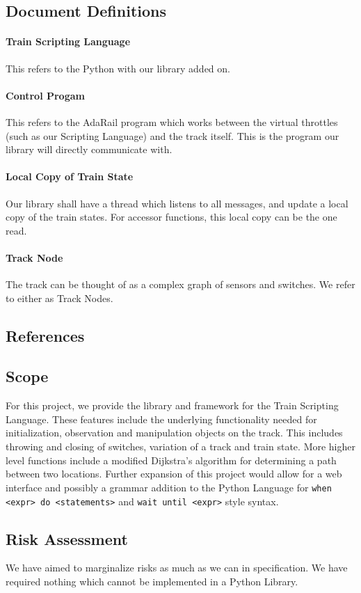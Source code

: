 \documentclass[a4paper,11pt,notitlepage]{article}
\def\TSL{Train Scripting Language\xspace}
\def\CS{Control Progam\xspace}
\def\LC{Local Copy of Train State\xspace}
\def\TN{Track Node\xspace}
\begin{document}
\subsection{Document Definitions}
\paragraph{\TSL} This refers to the Python with our library added on.
\paragraph{\CS} This refers to the AdaRail program which works between the virtual throttles (such as our Scripting Language) and the track itself. This is the program our library will directly communicate with.
\paragraph{\LC} Our library shall have a thread which listens to all messages, and update a local copy of the train states. For accessor functions, this local copy can be the one read.
\paragraph{\TN} The track can be thought of as a complex graph of sensors and switches. We refer to either as \TN{}s.
\subsection{References}

\newpage
\subsection{Scope}
For this project, we provide the library and framework for the \TSL. These features include the underlying functionality needed for initialization, observation and manipulation objects on the track.  This includes throwing and closing of switches, variation of a track and train state.  More higher level functions include a modified Dijkstra's algorithm for determining a path between two locations.  Further expansion of this project would allow for a web interface and possibly a grammar addition to the Python Language for \verb=when <expr> do <statements>= and \verb=wait until <expr>= style syntax.

\subsection{Risk Assessment}
We have aimed to marginalize risks as much as we can in specification. We have required nothing which cannot be implemented in a Python Library.
\end{document}
